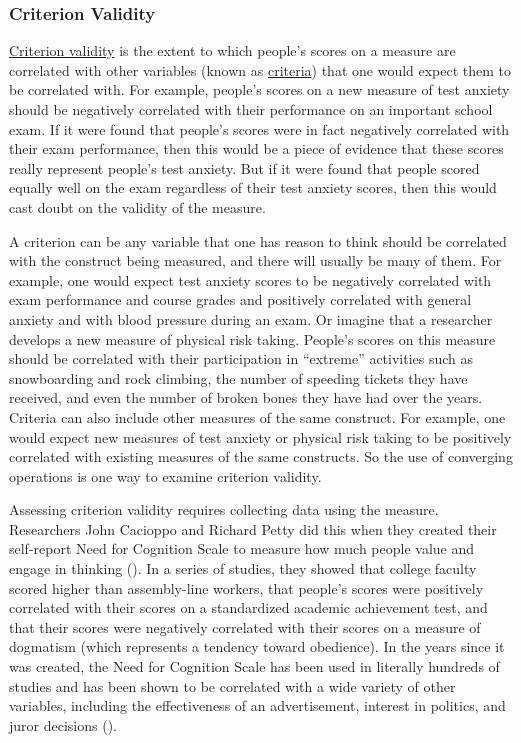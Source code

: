 \documentclass[
]{krantz}
\begin{document}
\subsubsection*{Criterion Validity}\label{criterion-validity}


\hyperref[criterion-validity]{Criterion validity} is the extent to which people's scores on a measure are correlated with other variables (known as \hyperref[criteria]{criteria}) that one would expect them to be correlated with. For example, people's scores on a new measure of test anxiety should be negatively correlated with their performance on an important school exam. If it were found that people's scores were in fact negatively correlated with their exam performance, then this would be a piece of evidence that these scores really represent people's test anxiety. But if it were found that people scored equally well on the exam regardless of their test anxiety scores, then this would cast doubt on the validity of the measure.

A criterion can be any variable that one has reason to think should be correlated with the construct being measured, and there will usually be many of them. For example, one would expect test anxiety scores to be negatively correlated with exam performance and course grades and positively correlated with general anxiety and with blood pressure during an exam. Or imagine that a researcher develops a new measure of physical risk taking. People's scores on this measure should be correlated with their participation in ``extreme'' activities such as snowboarding and rock climbing, the number of speeding tickets they have received, and even the number of broken bones they have had over the years. Criteria can also include other measures of the same construct. For example, one would expect new measures of test anxiety or physical risk taking to be positively correlated with existing measures of the same constructs. So the use of converging operations is one way to examine criterion validity.

Assessing criterion validity requires collecting data using the measure. Researchers John Cacioppo and Richard Petty did this when they created their self-report Need for Cognition Scale to measure how much people value and engage in thinking (). In a series of studies, they showed that college faculty scored higher than assembly-line workers, that people's scores were positively correlated with their scores on a standardized academic achievement test, and that their scores were negatively correlated with their scores on a measure of dogmatism (which represents a tendency toward obedience). In the years since it was created, the Need for Cognition Scale has been used in literally hundreds of studies and has been shown to be correlated with a wide variety of other variables, including the effectiveness of an advertisement, interest in politics, and juror decisions ().
\end{document}
